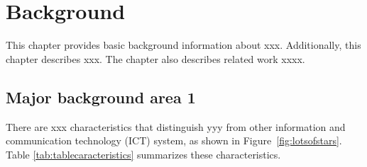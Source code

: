 \chapter{Background}
\label{ch:background}


This chapter provides basic background information about xxx. Additionally, this chapter describes xxx. The chapter also describes related work xxxx.




\section{Major background area 1}


There are xxx characteristics that distinguish yyy from other information and communication technology (ICT) system, as shown in Figure~\ref{fig:lotsofstars}. Table \ref{tab:tablecaracteristics} summarizes these characteristics.









